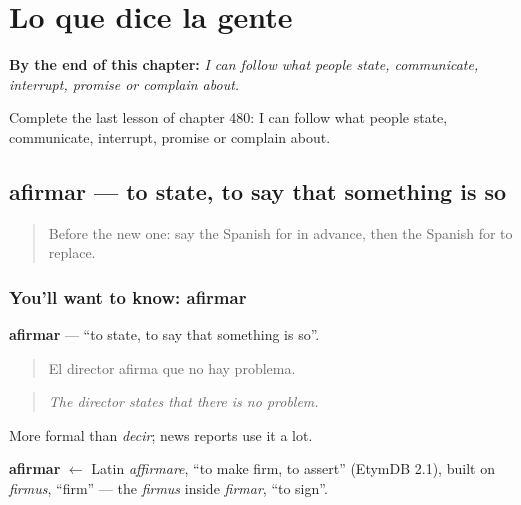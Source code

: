 
\chapter{Lo que dice la gente}
\label{ch:es-lo-que-dice-la-gente}

\begin{chapteropening}
\textbf{By the end of this chapter:} \emph{I can follow what people state, communicate, interrupt, promise or complain about.}

Complete the last lesson of chapter 480: I can follow what people state, communicate, interrupt, promise or complain about.
\end{chapteropening}

\section[afirmar]{afirmar — to state, to say that something is so}

\label{lesson:ES-C480-afirmar}



\begin{quote}
Before the new one: say the Spanish for in advance, then the Spanish for to replace.
\end{quote}

\subsection*{You'll want to know: afirmar}
\textbf{afirmar} — \textquotedblleft{}to state, to say that something is so\textquotedblright{}.

\begin{quote}
El director afirma que no hay problema.
\end{quote}

\begin{quote}
\emph{The director states that there is no problem.}
\end{quote}

More formal than \emph{decir}; news reports use it a lot.

\begin{cousinweb}
\textbf{afirmar} $\leftarrow$ Latin \emph{affirmare}, \textquotedblleft{}to make firm, to assert\textquotedblright{} (EtymDB 2.1), built on \emph{firmus}, \textquotedblleft{}firm\textquotedblright{} — the \emph{firmus} inside \emph{firmar}, \textquotedblleft{}to sign\textquotedblright{}.
\end{cousinweb}


